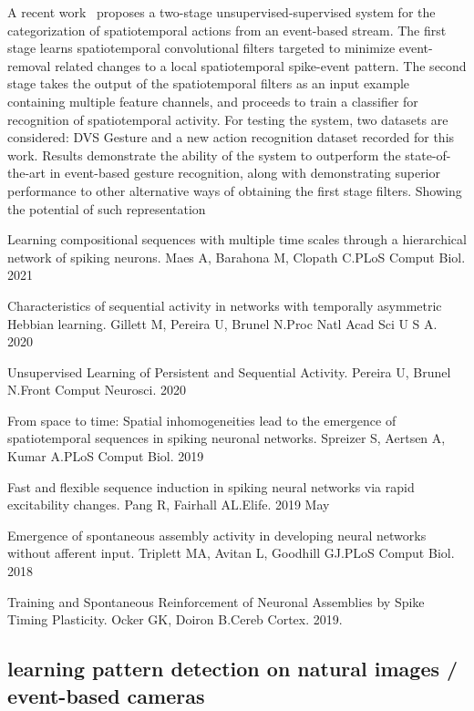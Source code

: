\documentclass[brainsci, %
               review,submit,pdftex,moreauthors]{Definitions/mdpi}
\begin{document}
A recent work~\citep{ghosh_spatiotemporal_2019} proposes a two-stage unsupervised-supervised system for the categorization of spatiotemporal actions from an event-based stream. The first stage learns spatiotemporal convolutional filters targeted to minimize event-removal related changes to a local spatiotemporal spike-event pattern. The second stage takes the output of the spatiotemporal filters as an input example containing multiple feature channels, and proceeds to train a classifier for recognition of spatiotemporal activity. For testing the system, two datasets are considered: DVS Gesture and a new action recognition dataset recorded for this work. Results demonstrate the ability of the system to outperform the state-of-the-art in event-based gesture recognition, along with demonstrating superior performance to other alternative ways of obtaining the first stage filters. Showing the potential of such representation

Learning compositional sequences with multiple time scales through a hierarchical network of spiking neurons.
Maes A, Barahona M, Clopath C.PLoS Comput Biol. 2021

Characteristics of sequential activity in networks with temporally asymmetric Hebbian learning.
Gillett M, Pereira U, Brunel N.Proc Natl Acad Sci U S A. 2020

Unsupervised Learning of Persistent and Sequential Activity.
Pereira U, Brunel N.Front Comput Neurosci. 2020

From space to time: Spatial inhomogeneities lead to the emergence of spatiotemporal sequences in spiking neuronal networks.
Spreizer S, Aertsen A, Kumar A.PLoS Comput Biol. 2019

Fast and flexible sequence induction in spiking neural networks via rapid excitability changes.
Pang R, Fairhall AL.Elife. 2019 May~\citep{pang_fast_2019}

Emergence of spontaneous assembly activity in developing neural networks without afferent input.
Triplett MA, Avitan L, Goodhill GJ.PLoS Comput Biol. 2018

Training and Spontaneous Reinforcement of Neuronal Assemblies by Spike Timing Plasticity.
Ocker GK, Doiron B.Cereb Cortex. 2019.


\subsection{learning pattern detection on natural images / event-based cameras}\label{learning-pattern-detection-on-natural-images-event-based-cameras}
\end{document}
